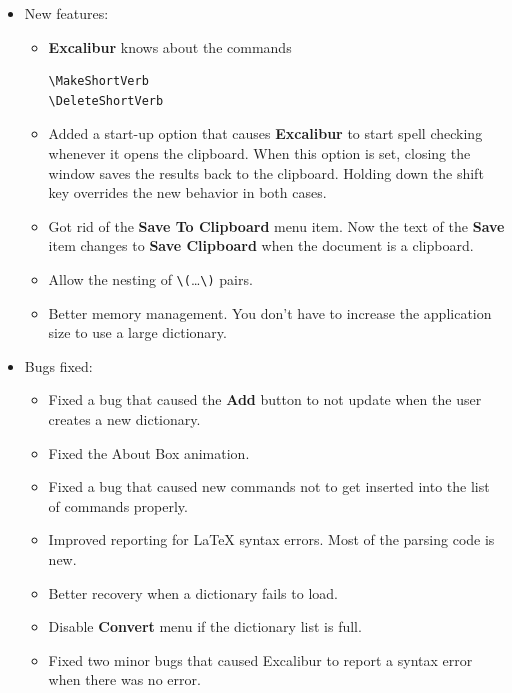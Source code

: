 ﻿\documentclass[11pt,titlepage]{article}
\newcommand{\ex}{\textbf{Excalibur}}
\begin{document}
\begin{itemize}

\item New features:

  \begin{itemize}

  \item \ex{} knows about the commands
\begin{verbatim}
\MakeShortVerb
\DeleteShortVerb
\end{verbatim}

  \item Added a start-up option that causes \ex{} to start spell
    checking whenever it opens the clipboard.  When this option is
    set, closing the window saves the results back to the clipboard.
    Holding down the shift key overrides the new behavior in both
    cases.

  \item Got rid of the \textbf{Save To Clipboard} menu item.  Now the
    text of the \textbf{Save} item changes to \textbf{Save Clipboard}
    when the document is a clipboard.

  \item Allow the nesting of \verb+\(+\ldots\verb+\)+ pairs.

  \item Better memory management.  You don't have to increase the
    application size to use a large dictionary.

  \end{itemize}

\item Bugs fixed:

  \begin{itemize}

  \item Fixed a bug that caused the \textbf{Add} button to not update
    when the user creates a new dictionary.

  \item Fixed the About Box animation.

  \item Fixed a bug that caused new commands not to get inserted into
    the list of commands properly.

  \item Improved reporting for \LaTeX{} syntax errors.  Most of the
    parsing code is new.

  \item Better recovery when a dictionary fails to load.

  \item Disable \textbf{Convert} menu if the dictionary list is full.

  \item Fixed two minor bugs that caused Excalibur to report a syntax
    error when there was no error.

  \end{itemize}

\end{itemize}
\end{document}
